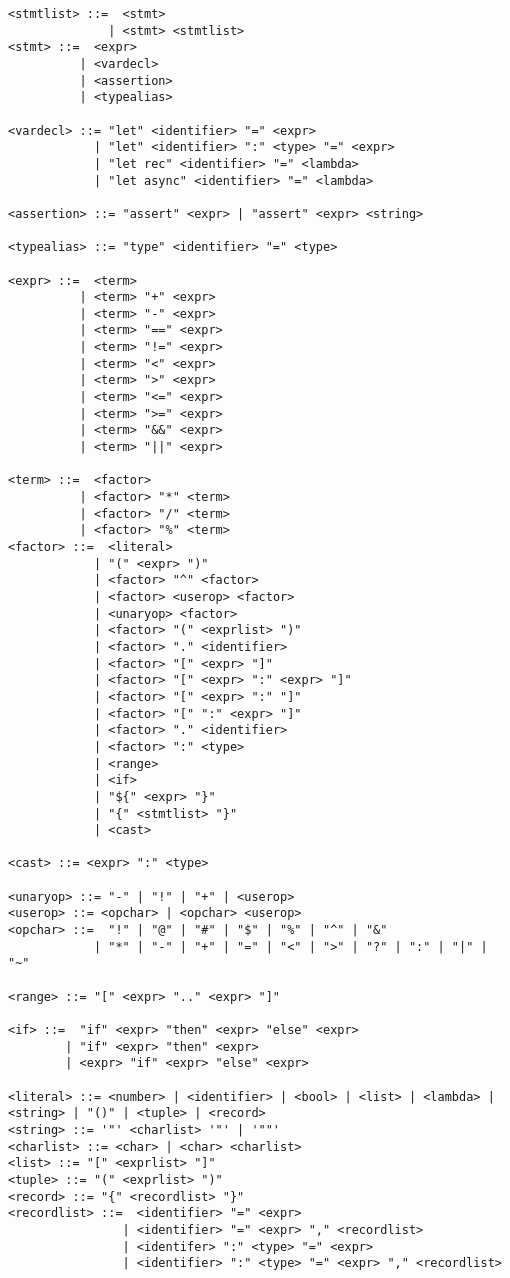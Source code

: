\begin{verbatim}
<stmtlist> ::=  <stmt> 
              | <stmt> <stmtlist>
<stmt> ::=  <expr> 
          | <vardecl>
          | <assertion>
          | <typealias>

<vardecl> ::= "let" <identifier> "=" <expr>
            | "let" <identifier> ":" <type> "=" <expr>
            | "let rec" <identifier> "=" <lambda>
            | "let async" <identifier> "=" <lambda>

<assertion> ::= "assert" <expr> | "assert" <expr> <string>

<typealias> ::= "type" <identifier> "=" <type>

<expr> ::=  <term> 
          | <term> "+" <expr> 
          | <term> "-" <expr>
          | <term> "==" <expr>
          | <term> "!=" <expr>
          | <term> "<" <expr>
          | <term> ">" <expr>
          | <term> "<=" <expr>
          | <term> ">=" <expr>
          | <term> "&&" <expr>
          | <term> "||" <expr>
            
<term> ::=  <factor> 
          | <factor> "*" <term> 
          | <factor> "/" <term> 
          | <factor> "%" <term> 
<factor> ::=  <literal> 
            | "(" <expr> ")" 
            | <factor> "^" <factor>
            | <factor> <userop> <factor>
            | <unaryop> <factor>
            | <factor> "(" <exprlist> ")"
            | <factor> "." <identifier>
            | <factor> "[" <expr> "]"
            | <factor> "[" <expr> ":" <expr> "]"
            | <factor> "[" <expr> ":" "]"
            | <factor> "[" ":" <expr> "]"
            | <factor> "." <identifier>
            | <factor> ":" <type>
            | <range>
            | <if>
            | "${" <expr> "}"
            | "{" <stmtlist> "}"
            | <cast>

<cast> ::= <expr> ":" <type>

<unaryop> ::= "-" | "!" | "+" | <userop>
<userop> ::= <opchar> | <opchar> <userop>
<opchar> ::=  "!" | "@" | "#" | "$" | "%" | "^" | "&" 
            | "*" | "-" | "+" | "=" | "<" | ">" | "?" | ":" | "|" | "~"

<range> ::= "[" <expr> ".." <expr> "]"

<if> ::=  "if" <expr> "then" <expr> "else" <expr>
        | "if" <expr> "then" <expr>
        | <expr> "if" <expr> "else" <expr>

<literal> ::= <number> | <identifier> | <bool> | <list> | <lambda> | <string> | "()" | <tuple> | <record>
<string> ::= '"' <charlist> '"' | '""'
<charlist> ::= <char> | <char> <charlist>
<list> ::= "[" <exprlist> "]"
<tuple> ::= "(" <exprlist> ")"
<record> ::= "{" <recordlist> "}"
<recordlist> ::=  <identifier> "=" <expr> 
                | <identifier> "=" <expr> "," <recordlist>
                | <identifer> ":" <type> "=" <expr> 
                | <identifier> ":" <type> "=" <expr> "," <recordlist>


\end{verbatim}

